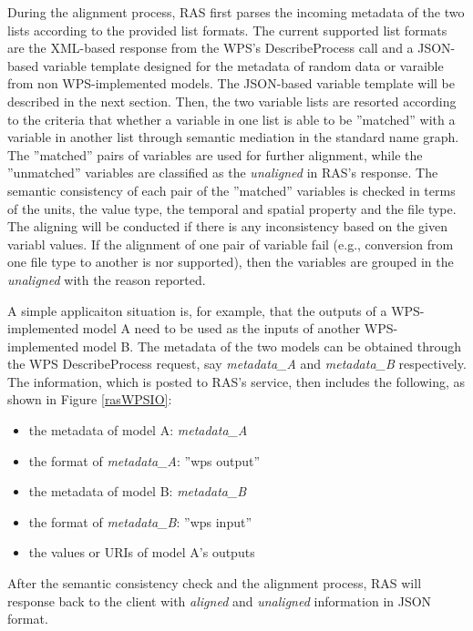 \documentclass[review]{elsarticle}
\begin{document}
During the alignment process, RAS first parses the incoming metadata of the two lists according to the provided list formats. The current supported list formats are the XML-based response from the WPS's DescribeProcess call and a JSON-based variable template designed for the metadata of random data or varaible from non WPS-implemented models. The JSON-based variable template will be described in the next section. Then, the two variable lists are resorted according to the criteria that whether a variable in one list is able to be ''matched'' with a variable in another list through semantic mediation in the standard name graph. The ''matched'' pairs of variables are used for further alignment, while the ''unmatched'' variables are classified as the \textit{unaligned} in RAS's response. The semantic consistency of each pair of the ''matched'' variables is checked in terms of the units, the value type, the temporal and spatial property and the file type. The aligning will be conducted if there is any inconsistency based on the given variabl values. If the alignment of one pair of variable fail (e.g., conversion from one file type to another is nor supported), then the variables are grouped in the \textit{unaligned} with the reason reported.

A simple applicaiton situation is, for example, that the outputs of a WPS-implemented model A need to be used as the inputs of another WPS-implemented model B. The metadata of the two models can be obtained through the WPS DescribeProcess request, say \textit{metadata\_A} and \textit{metadata\_B} respectively. The information, which is posted to RAS's service, then includes the following, as shown in Figure \ref{rasWPSIO}:
\begin{itemize}
\item the metadata of model A: \textit{metadata\_A}
\item the format of \textit{metadata\_A}: ''wps output''
\item the metadata of model B: \textit{metadata\_B}
\item the format of \textit{metadata\_B}: ''wps input''
\item the values or URIs of model A's outputs
\end{itemize}
After the semantic consistency check and the alignment process, RAS will response back to the client with \textit{aligned} and \textit{unaligned} information in JSON format.
\end{document}
